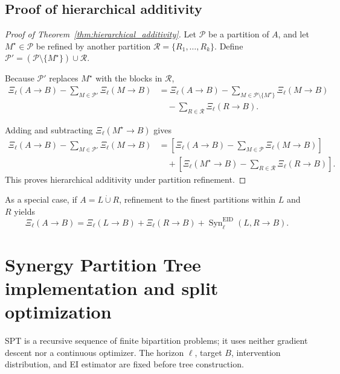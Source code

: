 \subsection{Proof of hierarchical additivity}
\label{app:proof_hierarchical_additivity}
\begin{proof}[Proof of Theorem~\ref{thm:hierarchical_additivity}]
Let \(\mathcal{P}\) be a partition of \(A\), and let
\(M^{\star}\in\mathcal{P}\) be refined by another partition
\(\mathcal{R}=\{R_1,\ldots,R_k\}\). Define
\(\mathcal{P}'
=(\mathcal{P}\setminus\{M^{\star}\})\cup\mathcal{R}\).

\par Because \(\mathcal{P}'\) replaces \(M^{\star}\) with the blocks in \(\mathcal{R}\),
\begin{align}
    \Xi_{\ell}(A\rightarrow B)-\sum_{M\in\mathcal{P}'}\Xi_{\ell}(M\rightarrow B)
    &=\Xi_{\ell}(A\rightarrow B)-\sum_{M\in\mathcal{P}\setminus\{M^{\star}\}}\Xi_{\ell}(M\rightarrow B)
    \nonumber\\
    &\quad-\sum_{R\in\mathcal{R}}\Xi_{\ell}(R\rightarrow B).
    \label{eq:supp_refined_synergy}\end{align}

Adding and subtracting \(\Xi_{\ell}(M^{\star}\rightarrow B)\) gives
\begin{align}
    \Xi_{\ell}(A\rightarrow B)-\sum_{M\in\mathcal{P}'}\Xi_{\ell}(M\rightarrow B)
    &=\left[\Xi_{\ell}(A\rightarrow B)-\sum_{M\in\mathcal{P}}\Xi_{\ell}(M\rightarrow B)\right]
    \nonumber\\
    &\quad+\left[\Xi_{\ell}(M^{\star}\rightarrow B)-\sum_{R\in\mathcal{R}}\Xi_{\ell}(R\rightarrow B)\right].
    \label{eq:supp_hierarchical_additivity}
\end{align}This proves hierarchical additivity under partition refinement.
\end{proof}

As a special case, if \(A=L\mathbin{\dot{\cup}}R\), refinement to the finest
partitions within \(L\) and \(R\) yields
\begin{equation}
    \Xi_{\ell}(A\rightarrow B)
    =
    \Xi_{\ell}(L\rightarrow B)
    +
    \Xi_{\ell}(R\rightarrow B)
    +
    \operatorname{Syn}^{\mathrm{EID}}_{\ell}
    (L,R\rightarrow B).
    \label{eq:supp_binary_hierarchy}
\end{equation}

\section{Synergy Partition Tree implementation and split optimization} 
\label{app:spt_implementation}
SPT is a recursive sequence of finite bipartition problems; it uses neither gradient descent nor a continuous optimizer. The horizon \(\ell\), target \(B\), intervention distribution, and EI estimator are fixed before tree construction. 

